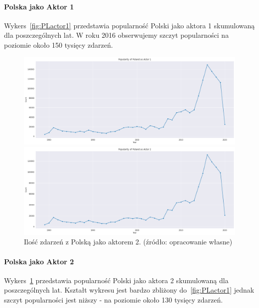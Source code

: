 \documentclass[11pt]{report}
\begin{document}
    \paragraph{Polska jako Aktor 1}
    Wykers~\ref{fig:PLactor1} przedstawia popularność Polski jako aktora 1 skumulowaną dla poszczególnych lat.
    W roku 2016 obserwujemy szczyt popularności na poziomie około 150 tysięcy zdarzeń.
    \begin{figure}[ht!]
        \centering
        \includegraphics[width=1 \textwidth]{fig/PL/PLactor1.png}
        \caption{Ilość zdarzeń z Polską jako aktorem 1. (źródło: opracowanie własne)}
        \label{fig:PLactor1}
        \includegraphics[width=1 \textwidth]{fig/PL/PLactor2.png}
        \caption{Ilość zdarzeń z Polską jako aktorem 2. (źródło: opracowanie własne)}
        \label{fig:PLactor2}
    \end{figure}

    \paragraph{Polska jako Aktor 2}
    Wykers~\ref{fig:PLactor2} przedstawia popularność Polski jako aktora 2 skumulowaną dla poszczególnych lat. Kształt wykresu jest bardzo zbliżony do~\ref{fig:PLactor1} jednak szczyt popularności jest niższy - na poziomie około 130 tysięcy zdarzeń.
\end{document}
